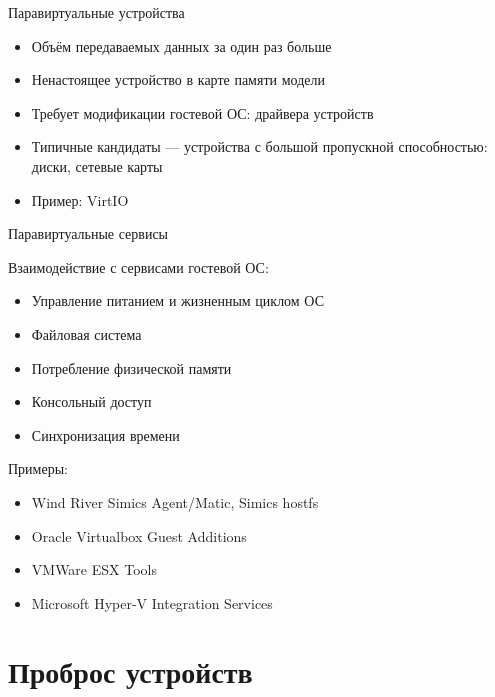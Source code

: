 \begin{frame}{Паравиртуальные устройства}

\begin{itemize}
\item Объём передаваемых данных за один раз больше
\item Ненастоящее устройство в карте памяти модели
\item Требует модификации гостевой ОС: драйвера устройств
\item Типичные кандидаты — устройства с большой пропускной способностью: диски,
сетевые карты
\item Пример: VirtIO~\cite{virtio}
\end{itemize}

\end{frame}

\begin{frame}{Паравиртуальные сервисы}

Взаимодействие с сервисами гостевой ОС:
\begin{itemize}
\item Управление питанием и жизненным циклом ОС
\item Файловая система
\item Потребление физической памяти 
\item Консольный доступ
\item Синхронизация времени~\cite{virt-time}
\end{itemize}

Примеры: 
\begin{itemize}
\item Wind River Simics Agent/Matic, Simics hostfs
\item Oracle Virtualbox Guest Additions
\item VMWare ESX Tools
\item Microsoft Hyper-V Integration Services~\cite{hyper-v-is}
\end{itemize}

\end{frame}

\section{Проброс устройств}

